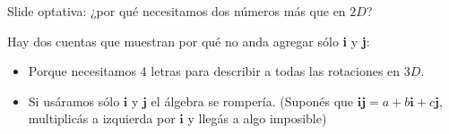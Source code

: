 \documentclass[10pt]{beamer}
\def\R{\mathbb{R}}
\def\ii{\textbf{i}}
\def\jj{\textbf{j}}
\begin{document}
\begin{frame}{Slide optativa: ¿por qué necesitamos dos números más que en $2D$?}

\large Hay dos cuentas que muestran por qué no anda agregar sólo \textbf{\ii} y \textbf{\jj}:

\normalsize

\begin{itemize}
    \item Porque necesitamos 4 letras para describir a todas las rotaciones en $3D$. 
    \item Si usáramos sólo $\ii$ y $\jj$ el álgebra se rompería. (Suponés que $\ii\jj=a+b\ii+c\jj$, multiplicás a izquierda por $\ii$ y llegás a algo imposible)
\end{itemize}

\end{frame}
\end{document}
